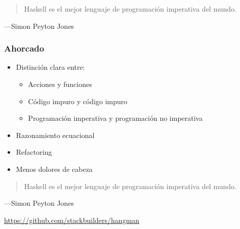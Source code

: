 \documentclass[spanish]{beamer}
\begin{document}

\begin{frame}
  \begin{quote}
    Haskell es el mejor lenguaje de programación imperativa del mundo.
  \end{quote}
  \hfill---Simon Peyton Jones
\end{frame}


\begin{frame}
  \frametitle{Ahorcado}

\end{frame}


\begin{frame}
  \begin{itemize}
  \item
    Distinción clara entre:
    \begin{itemize}
    \item Acciones y funciones
    \item Código impuro y código impuro
    \item Programación imperativa y programación no imperativa
    \end{itemize}
  \item
    Razonamiento ecuacional
  \item
    Refactoring
  \item
    Menos dolores de cabeza
  \end{itemize}
\end{frame}


\begin{frame}
  \begin{quote}
    Haskell es el mejor lenguaje de programación imperativa del mundo.
  \end{quote}
  \hfill---Simon Peyton Jones
\end{frame}


\begin{frame}
  \begin{center}
    \url{https://github.com/stackbuilders/hangman}
  \end{center}
\end{frame}
\end{document}
